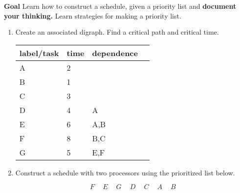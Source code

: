 \documentclass[12pt]{article}
\begin{document}
\textbf{Goal} Learn how to construct a schedule, given a priority list and \textbf{document your thinking.} Learn strategies for making a priority list.\\

\begin{enumerate}
\item Create an associated digraph. Find a critical path and critical time.\\

\begin{tabular}{llll}
label/task&time&dependence\\
\hline
A&2&\\
B&1&\\
C&3&\\
D&4&A\\
E&6&A,B\\
F&8&B,C\\
G&5&E,F\\
\end{tabular}

\vspace{.3in}

\item Construct a schedule with two processors using the prioritized list below. 

$$F \:\quad E \:\quad G \:\quad D \:\quad C \:\quad A \: \quad B$$

\vspace{.2in}

\end{enumerate}
\end{document}
